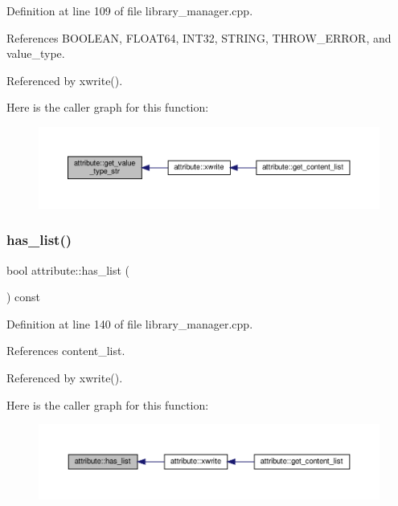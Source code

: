 Definition at line 109 of file library\+\_\+manager.\+cpp.



References B\+O\+O\+L\+E\+AN, F\+L\+O\+A\+T64, I\+N\+T32, S\+T\+R\+I\+NG, T\+H\+R\+O\+W\+\_\+\+E\+R\+R\+OR, and value\+\_\+type.



Referenced by xwrite().

Here is the caller graph for this function\+:
\nopagebreak
\begin{figure}[H]
\begin{center}
\leavevmode
\includegraphics[width=350pt]{d9/d18/structattribute_a6d201447a5f5565c639c328ef5ef7e5c_icgraph}
\end{center}
\end{figure}
\mbox{\label{structattribute_abecb051f6ca4b712e18893876004f4d8}} 
\subsubsection{\texorpdfstring{has\+\_\+list()}{has\_list()}}
{\footnotesize\ttfamily bool attribute\+::has\+\_\+list (\begin{DoxyParamCaption}{ }\end{DoxyParamCaption}) const}



Definition at line 140 of file library\+\_\+manager.\+cpp.



References content\+\_\+list.



Referenced by xwrite().

Here is the caller graph for this function\+:
\nopagebreak
\begin{figure}[H]
\begin{center}
\leavevmode
\includegraphics[width=350pt]{d9/d18/structattribute_abecb051f6ca4b712e18893876004f4d8_icgraph}
\end{center}
\end{figure}
\mbox{\label{structattribute_a6566479d56d67782449458532846cfc3}} 
